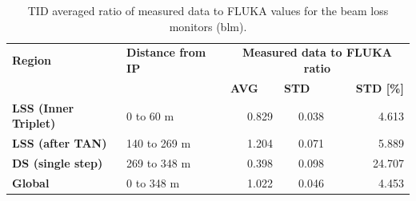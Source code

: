 \documentclass[encoding=utf8,british]{tumphthesis}
\begin{document}
\begin{table}[H]
\caption{TID averaged ratio of measured data to FLUKA values for the beam loss monitors (\acrshort{blm}).}
\label{tab:LHC-agreement-levels-BLMs}
    \begin{subtable}{1.0\textwidth}
    \centering
    \label{tab:agreement-levels-BLMs-2016}
\begin{tabular}{|l|l|rrr|}
\hline
\rowcolor[HTML]{CFE2F3} 
\textbf{Region}              & \textbf{Distance from IP} & \multicolumn{3}{c|}{\cellcolor[HTML]{CFE2F3}\textbf{Measured data to FLUKA ratio}}                                             \\ 
                             &               & \multicolumn{1}{l}{\textbf{AVG}} & \multicolumn{1}{l}{\textbf{STD}} & \multicolumn{1}{r|}{\textbf{STD {[}\%{]}}} \\ \hline
\rowcolor[HTML]{CFE2F3} 
\textbf{LSS (Inner Triplet)} & 0 to 60 m     & 0.829                              & 0.038                             & 4.613                                      \\
\textbf{LSS (after TAN)}     & 140 to 269 m  & 1.204                              & 0.071                             & 5.889                                      \\
\rowcolor[HTML]{CFE2F3} 
\textbf{DS (single step)}    & 269 to 348 m  & 0.398                              & 0.098                             & 24.707                                     \\ \hline
\textbf{Global}              & 0 to 348 m    & 1.022                              & 0.046                             & 4.453                                      \\ \hline
\end{tabular}
\end{subtable}

    \bigskip

    \hfill


\end{table}
\end{document}
